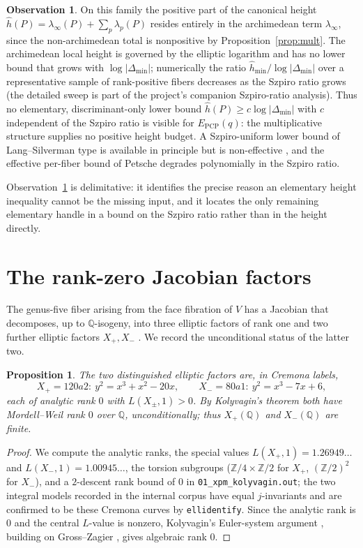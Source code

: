 \documentclass[11pt,reqno]{amsart}
\theoremstyle{plain}
\newtheorem{proposition}[theorem]{Proposition}
\theoremstyle{definition}
\newtheorem{observation}[theorem]{Observation}
\theoremstyle{remark}
\newcommand{\Q}{\mathbb{Q}}
\newcommand{\Z}{\mathbb{Z}}
\newcommand{\EPCP}{E_{\mathrm{PCP}}}
\begin{document}
\begin{observation}\label{obs:noabs}
On this family the positive part of the canonical height
$\widehat{h}(P)=\lambda_\infty(P)+\sum_p\lambda_p(P)$ resides entirely in the
archimedean term $\lambda_\infty$, since the non-archimedean total is nonpositive by
Proposition~\ref{prop:mult}. The archimedean local height is governed by the elliptic
logarithm and has no lower bound that grows with $\log|\Delta_{\min}|$; numerically the
ratio $\widehat{h}_{\min}/\log|\Delta_{\min}|$ over a representative sample of
rank-positive fibers decreases as the Szpiro ratio grows (the detailed sweep is part of
the project's companion Szpiro-ratio analysis). Thus no elementary,
discriminant-only lower bound $\widehat{h}(P)\ge c\log|\Delta_{\min}|$ with $c$
independent of the Szpiro ratio is visible for $\EPCP(q)$: the multiplicative
structure supplies no positive height budget. A Szpiro-uniform lower bound of
Lang--Silverman type is available in principle but is non-effective \cite{Wagener},
and the effective per-fiber bound of Petsche \cite{Petsche} degrades polynomially in
the Szpiro ratio.
\end{observation}

Observation~\ref{obs:noabs} is delimitative: it identifies the precise reason an
elementary height inequality cannot be the missing input, and it locates the only
remaining elementary handle in a bound on the Szpiro ratio rather than in the height
directly.

\section{The rank-zero Jacobian factors}\label{sec:ranks}

The genus-five fiber arising from the face fibration of $V$ has a Jacobian that
decomposes, up to $\Q$-isogeny, into three elliptic factors of rank one and two
further elliptic factors $X_+,X_-$ \cite[\S2]{vanLuijk}. We record the unconditional
status of the latter two.

\begin{proposition}\label{prop:xpm}
The two distinguished elliptic factors are, in Cremona labels,
\[
X_+=120a2:\ y^2=x^3+x^2-20x,\qquad X_-=80a1:\ y^2=x^3-7x+6,
\]
each of analytic rank $0$ with $L(X_\pm,1)>0$. By Kolyvagin's theorem
\cite{Kolyvagin} both have Mordell--Weil rank $0$ over $\Q$, unconditionally; thus
$X_+(\Q)$ and $X_-(\Q)$ are finite.
\end{proposition}

\begin{proof}
We compute the analytic ranks, the special values
$L(X_+,1)=1.26949\ldots$ and $L(X_-,1)=1.00945\ldots$, the torsion subgroups
($\Z/4\times\Z/2$ for $X_+$, $(\Z/2)^2$ for $X_-$), and a $2$-descent rank bound of
$0$ in \texttt{01\_xpm\_kolyvagin.out}; the two integral models recorded in the
internal corpus have equal $j$-invariants and are confirmed to be these Cremona
curves by \texttt{ellidentify}. Since the analytic rank is $0$ and the central
$L$-value is nonzero, Kolyvagin's Euler-system argument \cite{Kolyvagin}, building on
Gross--Zagier \cite{GrossZagier}, gives algebraic rank $0$.
\end{proof}
\end{document}
